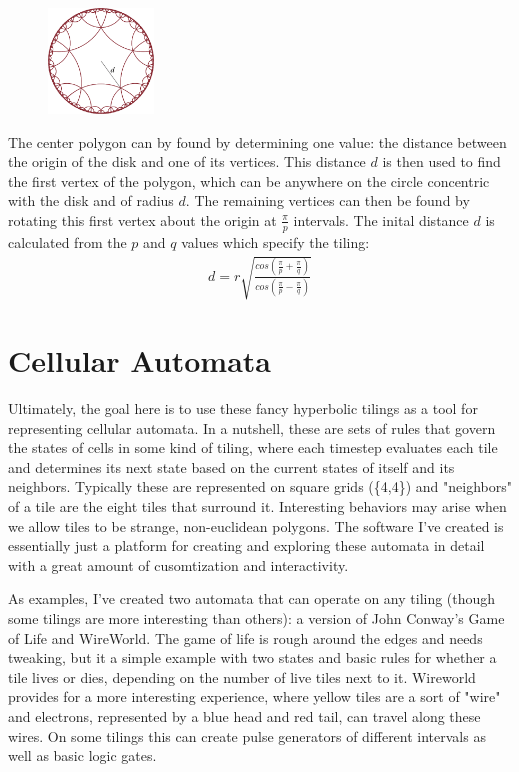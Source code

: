\documentclass[letterpaper,12pt]{article}
\begin{document}
\begin{figure}
\includegraphics[width=0.25\textwidth]{../tilingDistance.png}
\end{figure}

The center polygon can by found by determining one value: the distance between the origin of the disk and one of its vertices. This distance $d$ is then used to find the first vertex of the polygon, which can be anywhere on the circle concentric with the disk and of radius $d$.  The remaining vertices can then be found by rotating this first vertex about the origin at $\frac{\pi}{p}$ intervals. The inital distance $d$ is calculated from the $p$ and $q$ values which specify the tiling:
\begin{gather*}
d = r\sqrt{\frac{cos(\frac{\pi}{p} + \frac{\pi}{q})}{cos(\frac{\pi}{p} - \frac{\pi}{q})}}
\end{gather*}

\section*{Cellular Automata}

Ultimately, the goal here is to use these fancy hyperbolic tilings as a tool for representing cellular automata. In a nutshell, these are sets of rules that govern the states of cells in some kind of tiling, where each timestep evaluates each tile and determines its next state based on the current states of itself and its neighbors. Typically these are represented on square grids (\{4,4\}) and "neighbors" of a tile are the eight tiles that surround it. Interesting behaviors may arise when we allow tiles to be strange, non-euclidean polygons. The software I've created is essentially just a platform for creating and exploring these automata in detail with a great amount of cusomtization and interactivity.

As examples, I've created two automata that can operate on any tiling (though some tilings are more interesting than others): a version of John Conway's Game of Life and WireWorld. The game of life is rough around the edges and needs tweaking, but it a simple example with two states and basic rules for whether a tile lives or dies, depending on the number of live tiles next to it. Wireworld provides for a more interesting experience, where yellow tiles are a sort of "wire" and electrons, represented by a blue head and red tail, can travel along these wires. On some tilings this can create pulse generators of different intervals as well as basic logic gates.
\end{document}
